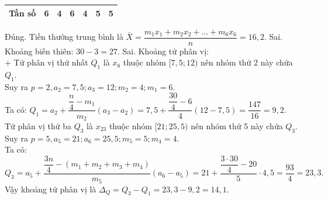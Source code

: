\begin{ex}
{\begin{itemchoice}
\begin{center}
\begin{tabular}{|c|c|c|c|c|c|c|}
					\hline Tần số & 6 & 4 & 6 & 4 & 5 & 5 \\
					\hline
				\end{tabular}
			\end{center}
			\itemch Đúng. Tiền thưởng trung bình là $\bar{X}=\dfrac{m_1 x_1+m_2 x_2+\ldots+m_6 x_6}{n}=16,2$.
			\itemch Sai.  Khoảng biến thiên: $30-3=27$.%
			\itemch Sai.  Khoảng tứ phân vị:\\
			+ Tứ phân vị thứ nhất $Q_1$ là $x_8$ thuộc nhóm $[7,5 ; 12)$ nên nhóm thứ 2 này chứa $Q_1$.\\
			Suy ra $p=2, a_2=7,5 ; a_3=12 ; m_2=4 ; m_1=6$.\\
			Ta có: $Q_1=a_2+\dfrac{\dfrac{n}{4}-m_1}{m_2}\left(a_3-a_2\right)=7,5+\dfrac{\dfrac{30}{4}-6}{4}(12-7,5)=\dfrac{147}{16}=9,2$.\\
			Tứ phân vị thứ ba $Q_3$ là $x_{23}$ thuộc nhóm $[21 ; 25,5)$ nên nhóm thứ 5 này chứa $Q_3$.\\
			Suy ra $p=5, a_5=21 ; a_6=25,5 ; m_5=5 ; m_4=4$.\\
			Ta có: $$Q_3=a_5+\dfrac{\dfrac{3 n}{4}-\left(m_1+m_2+m_3+m_4\right)}{m_5}\left(a_6-a_5\right)=21+\dfrac{\dfrac{3 \cdot 30}{4}-20}{5} \cdot 4,5=\frac{93}{4}=23,3.$$
			Vậy khoảng tứ phân vị là $\Delta_Q=Q_3-Q_1=23,3-9,2=14,1$.
		\end{itemchoice}
	}
\end{ex}

